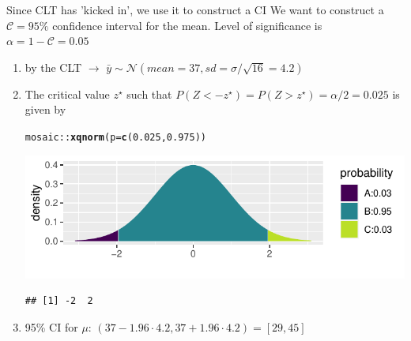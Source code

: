 \documentclass[10pt,handout]{beamer}\usepackage[]{graphicx}\usepackage[]{color}
\makeatletter
\def\maxwidth{ %
  \ifdim\Gin@nat@width>\linewidth
    \linewidth
  \else
    \Gin@nat@width
  \fi
}
\newcommand{\hlnum}[1]{\textcolor[rgb]{0.686,0.059,0.569}{#1}}%
\newcommand{\hlopt}[1]{\textcolor[rgb]{0,0,0}{#1}}%
\newcommand{\hlstd}[1]{\textcolor[rgb]{0.345,0.345,0.345}{#1}}%
\newcommand{\hlkwc}[1]{\textcolor[rgb]{0.333,0.667,0.333}{#1}}%
\newcommand{\hlkwd}[1]{\textcolor[rgb]{0.737,0.353,0.396}{\textbf{#1}}}%
\newenvironment{kframe}{%
 \def\at@end@of@kframe{}%
 \ifinner\ifhmode%
  \def\at@end@of@kframe{\end{minipage}}%
  \begin{minipage}{\columnwidth}%
 \fi\fi%
 \def\FrameCommand##1{\hskip\@totalleftmargin \hskip-\fboxsep
 \colorbox{shadecolor}{##1}\hskip-\fboxsep
     \hskip-\linewidth \hskip-\@totalleftmargin \hskip\columnwidth}%
 \MakeFramed {\advance\hsize-\width
   \@totalleftmargin\z@ \linewidth\hsize
   \@setminipage}}%
 {\par\unskip\endMakeFramed%
 \at@end@of@kframe}
\newenvironment{knitrout}{}{} %
\makeatother
\begin{document}
\begin{frame}[fragile]{Since CLT has 'kicked in', we use it to construct a CI}
	\small
	We want to construct a $\mathcal{C} = 95\%$ confidence interval for the mean. Level of significance is $\alpha = 1-\mathcal{C} = 0.05$ \pause
	
	\begin{enumerate}
		\setlength\itemsep{1em}
		\item by the CLT $\to$ $\bar{y} \sim \mathcal{N}(mean = 37, sd = \sigma/\sqrt{16} = 4.2)$ \pause
		\item The critical value $z^\star$ such that $P(Z < -z^\star) = P(Z > z^\star) = \alpha/2 = 0.025$ is given by 
\begin{knitrout}\tiny
{}\color{fgcolor}\begin{kframe}
\begin{alltt}
\hlstd{mosaic}\hlopt{::}\hlkwd{xqnorm}\hlstd{(}\hlkwc{p} \hlstd{=} \hlkwd{c}\hlstd{(}\hlnum{0.025}\hlstd{,} \hlnum{0.975}\hlstd{))}
\end{alltt}
\end{kframe}

{\centering \includegraphics[width=\maxwidth]{figure/unnamed-chunk-4-1} 

}


\begin{kframe}\begin{verbatim}
## [1] -2  2
\end{verbatim}
\end{kframe}
\end{knitrout}
		\pause
		\item 95\% CI for $\mu$: $(37 - 1.96 \cdot 4.2, 37 + 1.96 \cdot 4.2) = [29, 45]$
	\end{enumerate}
\end{frame}
\end{document}
